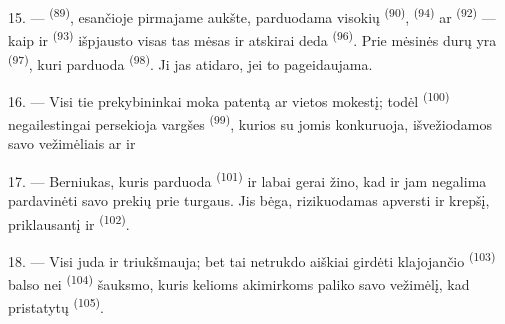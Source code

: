 15. ---  \textsuperscript{(89)}, esančioje pirmajame aukšte,
parduodama visokių  \textsuperscript{(90)}, 
\textsuperscript{(94)} ar  \textsuperscript{(92)} --- kaip
 ir 
 \textsuperscript{(93)} išpjausto visas tas mėsas ir
atskirai deda  \textsuperscript{(96)}. Prie mėsinės durų yra
 \textsuperscript{(97)}, kuri parduoda 
\textsuperscript{(98)}. Ji jas atidaro, jei to pageidaujama.

16. --- Visi tie prekybininkai moka patentą ar vietos mokestį; todėl
 \textsuperscript{(100)} negailestingai persekioja vargšes
 \textsuperscript{(99)}, kurios su jomis konkuruoja,
išvežiodamos savo vežimėliais  ar
 ir

\VUsaut{4.0mm}
\VUsaut{3.0mm}

17. --- Berniukas, kuris parduoda  \textsuperscript{(101)} ir
 labai gerai žino, kad ir jam negalima pardavinėti savo prekių prie
turgaus. Jis bėga, rizikuodamas apversti  ir 
krepšį, priklausantį  ir  
\textsuperscript{(102)}.

18. --- Visi juda ir triukšmauja; bet tai netrukdo aiškiai girdėti klajojančio
 \textsuperscript{(103)} balso nei 
\textsuperscript{(104)} šauksmo, kuris kelioms akimirkoms paliko savo vežimėlį, kad
pristatytų  \textsuperscript{(105)}.

\VUsaut{6.0mm}
\VUfilet{22mm}
